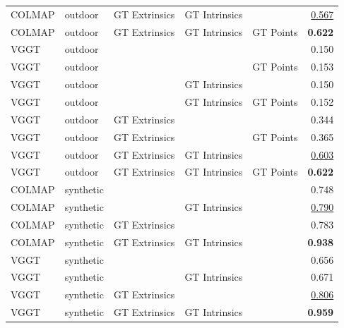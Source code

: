 \begin{table}[H]
\begin{tabular}{lllllr}
COLMAP & outdoor & GT Extrinsics & GT Intrinsics &  & \underline{0.567} \\
COLMAP & outdoor & GT Extrinsics & GT Intrinsics & GT Points & \textbf{0.622} \\
\midrule
VGGT & outdoor &  &  &  & 0.150 \\
VGGT & outdoor &  &  & GT Points & 0.153 \\
VGGT & outdoor &  & GT Intrinsics &  & 0.150 \\
VGGT & outdoor &  & GT Intrinsics & GT Points & 0.152 \\
VGGT & outdoor & GT Extrinsics &  &  & 0.344 \\
VGGT & outdoor & GT Extrinsics &  & GT Points & 0.365 \\
VGGT & outdoor & GT Extrinsics & GT Intrinsics &  & \underline{0.603} \\
VGGT & outdoor & GT Extrinsics & GT Intrinsics & GT Points & \textbf{0.622} \\
\midrule
COLMAP & synthetic &  &  &  & 0.748 \\
COLMAP & synthetic &  & GT Intrinsics &  & \underline{0.790} \\
COLMAP & synthetic & GT Extrinsics &  &  & 0.783 \\
COLMAP & synthetic & GT Extrinsics & GT Intrinsics &  & \textbf{0.938} \\
\midrule
VGGT & synthetic &  &  &  & 0.656 \\
VGGT & synthetic &  & GT Intrinsics &  & 0.671 \\
VGGT & synthetic & GT Extrinsics &  &  & \underline{0.806} \\
VGGT & synthetic & GT Extrinsics & GT Intrinsics &  & \textbf{0.959} \\
\bottomrule
\end{tabular}
\end{table}